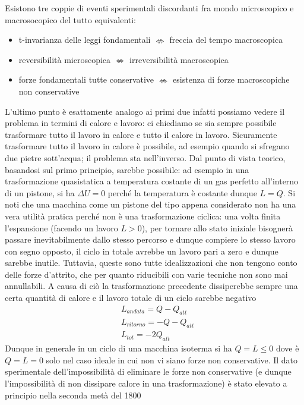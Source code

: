 \documentclass[
10pt, %
a4paper, %
oneside, %
headinclude,footinclude, %
BCOR5mm, %
]{scrartcl}
\begin{document}
Esistono tre coppie di eventi sperimentali discordanti fra mondo microscopico e macrosocopico del tutto equivalenti:
\begin{itemize}
	\item t-invarianza delle leggi fondamentali $\nLeftrightarrow$ freccia del tempo macroscopica
	\item reversibilità microscopica $\nLeftrightarrow$ irreversibilità macroscopica
	\item forze fondamentali tutte conservative $\nLeftrightarrow$ esistenza di forze macroscopiche non conservative
\end{itemize}
L'ultimo punto è esattamente analogo ai primi due infatti possiamo vedere il problema in termini di calore e lavoro: ci chiediamo se sia sempre possibile trasformare tutto il lavoro in calore e tutto il calore in lavoro. Sicuramente trasformare tutto il lavoro in calore è possibile, ad esempio quando si sfregano due pietre sott'acqua; il problema sta nell'inverso. Dal punto di vista teorico, basandosi sul primo principio, sarebbe possibile: ad esempio in una trasformazione quasistatica a temperatura costante di un gas perfetto all'interno di un pistone, si ha $\Delta U = 0$ perché la temperatura è costante dunque \(L = Q\).
Si noti che una macchina come un pistone del tipo appena considerato non ha una vera utilità pratica perché non è una trasformazione ciclica: una volta finita l'espansione (facendo un lavoro $L>0$), per tornare allo stato iniziale bisognerà passare inevitabilmente dallo stesso percorso e dunque compiere lo stesso lavoro con segno opposto, il ciclo in totale avrebbe un lavoro pari a zero e dunque sarebbe inutile. Tuttavia, queste sono tutte idealizzazioni che non tengono conto delle forze d'attrito, che per quanto riducibili con varie tecniche non sono mai annullabili. A causa di ciò la trasformazione precedente dissiperebbe sempre una certa quantità di calore e il lavoro totale di un ciclo sarebbe negativo
\begin{align*}
	&L_{andata} = Q-Q_{att}\\
	&L_{ritorno} = -Q-Q_{att}\\
	&L_{tot} = -2Q_{att}
\end{align*}
Dunque in generale in un ciclo di una macchina isoterma si ha \(Q = L \leq 0\) dove è \(Q=L=0\) solo nel caso ideale in cui non vi siano forze non conservative. Il dato sperimentale dell'impossibilità di eliminare le forze non conservative (e dunque l'impossibilità di non dissipare calore in una trasformazione) è stato elevato a principio nella seconda metà del 1800
\end{document}
